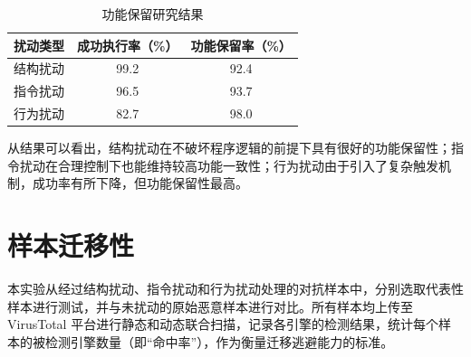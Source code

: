 \begin{table}[htb]
	\centering
	\caption{功能保留研究结果}
	\label{tab:5.12}
	\begin{tabular*}{0.9\textwidth}{@{\extracolsep{\fill}}ccc}
		\toprule
		扰动类型 & 成功执行率（\%） & 功能保留率（\%） \\
		\midrule
		结构扰动 & 99.2 & 92.4 \\
		指令扰动 & 96.5 & 93.7 \\
		行为扰动 & 82.7 & 98.0 \\
		\bottomrule
	\end{tabular*}
\end{table}

从结果可以看出，结构扰动在不破坏程序逻辑的前提下具有很好的功能保留性；指令扰动在合理控制下也能维持较高功能一致性；行为扰动由于引入了复杂触发机制，成功率有所下降，但功能保留性最高。


\section{样本迁移性}



本实验从经过结构扰动、指令扰动和行为扰动处理的对抗样本中，分别选取代表性样本进行测试，并与未扰动的原始恶意样本进行对比。所有样本均上传至 VirusTotal 平台进行静态和动态联合扫描，记录各引擎的检测结果，统计每个样本的被检测引擎数量（即“命中率”），作为衡量迁移逃避能力的标准。

